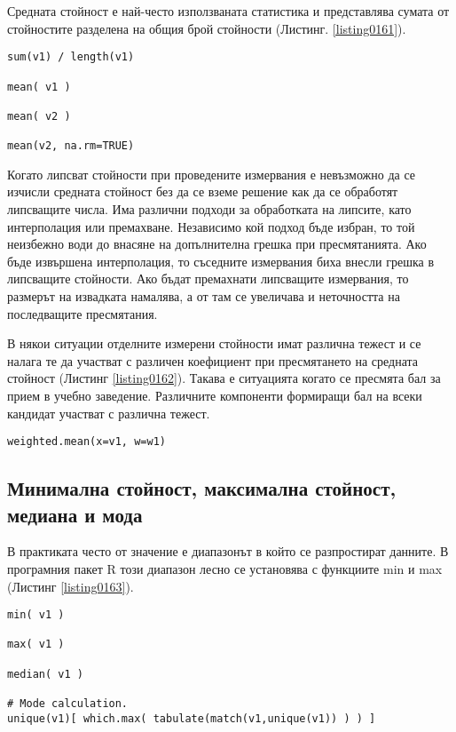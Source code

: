 Средната стойност е най-често използваната статистика и представлява сумата от стойностите разделена на общия брой стойности (Листинг. \ref{listing0161}).

\begin{lstlisting}[caption=Средна стойност, label=listing0161]
sum(v1) / length(v1)

mean( v1 )

mean( v2 )

mean(v2, na.rm=TRUE)
\end{lstlisting}

Когато липсват стойности при проведените измервания е невъзможно да се изчисли средната стойност без да се вземе решение как да се обработят липсващите числа. Има различни подходи за обработката на липсите, като интерполация или премахване. Независимо кой подход бъде избран, то той неизбежно води до внасяне на допълнителна грешка при пресмятанията. Ако бъде извършена интерполация, то съседните измервания биха внесли грешка в липсващите стойности. Ако бъдат премахнати липсващите измервания, то размерът на извадката намалява, а от там се увеличава и неточността на последващите пресмятания. 

В някои ситуации отделните измерени стойности имат различна тежест и се налага те да участват с различен коефициент при пресмятането на средната стойност (Листинг \ref{listing0162}). Такава е ситуацията когато се пресмята бал за прием в учебно заведение. Различните компоненти формиращи бал на всеки кандидат участват с различна тежест.

\begin{lstlisting}[caption=Претеглена средна стойност, label=listing0162]
weighted.mean(x=v1, w=w1)
\end{lstlisting}

\subsection{Минимална стойност, максимална стойност, медиана и мода}

В практиката често от значение е диапазонът в който се разпростират данните. В програмния пакет R този диапазон лесно се установява с функциите min и max (Листинг \ref{listing0163}).

\begin{lstlisting}[caption={Минимум, максимум, медиана и мода}, label=listing0163]
min( v1 )

max( v1 )

median( v1 )

# Mode calculation.
unique(v1)[ which.max( tabulate(match(v1,unique(v1)) ) ) ]
\end{lstlisting}

